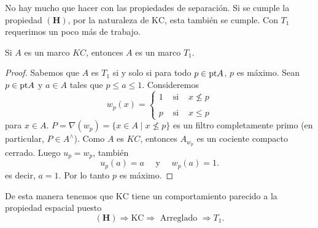 No hay mucho que hacer con las propiedades de separación. Si se cumple la propiedad $\mathbf{(H)}$, por la naturaleza de $\mathrm{KC}$, esta también se cumple. Con $T_1$ requerimos un poco más de trabajo.

\begin{prop}\label{KCT1}
    Si $A$ es un marco $KC$, entonces $A$ es un marco $T_1$.
\end{prop}

\begin{proof}
Sabemos que $A$ es $T_1$ si y solo si para todo $p\in \mathrm{pt} A$, $p$ es máximo. Sean $p\in \mathrm{pt} A$ y $a\in A$ tales que $p\leq a\leq 1$. Consideremos 
\[
w_p(x)=\left\{\begin{array}{lcc}
1 & \mbox{ si } & x\nleq p\\
\\
p & \mbox{ si } & x\leq p
\end{array}\right.
\]
para $x\in A$. $P=\nabla(w_p)=\{x\in A\mid x\nleq p\}$ es un filtro completamente primo (en particular, $P\in A^\wedge$). Como $A$ es $KC$, entonces $A_{w_p}$ es un cociente compacto cerrado. Luego $u_p=w_p$, también
\[
u_p(a)=a\quad \mbox{ y }\quad w_p(a)=1.
\]
es decir, $a=1$. Por lo tanto $p$ es máximo. 
\end{proof}

De esta manera tenemos que $\mathrm{KC}$ tiene un comportamiento parecido a la propiedad espacial puesto
\[
\mathbf{(H)} \Rightarrow \mathrm{KC} \Rightarrow \mbox{ Arreglado }\Rightarrow T_1.
\]

